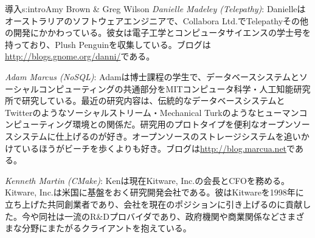 \begin{aosachapter}{導入}{s:intro}{Amy Brown \& Greg Wilson}
\emph{Danielle Madeley (Telepathy)}: Danielleはオーストラリアのソフトウェアエンジニアで、Collabora Ltd.でTelepathyその他の開発にかかわっている。彼女は電子工学とコンピュータサイエンスの学士号を持っており、Plush Penguinを収集している。ブログは\url{http://blogs.gnome.org/danni/}である。

\emph{Adam Marcus (NoSQL)}: Adamは博士課程の学生で、データベースシステムとソーシャルコンピューティングの共通部分をMITコンピュータ科学・人工知能研究所で研究している。最近の研究内容は、伝統的なデータベースシステムとTwitterのようなソーシャルストリーム・Mechanical Turkのようなヒューマンコンピューティング環境との関係だ。研究用のプロトタイプを便利なオープンソースシステムに仕上げるのが好き。オープンソースのストレージシステムを追いかけているほうがビーチを歩くよりも好き。ブログは\url{http://blog.marcua.net}である。

\emph{Kenneth Martin (CMake)}: Kenは現在Kitware, Inc.の会長とCFOを務める。Kitware, Inc.は米国に基盤をおく研究開発会社である。彼はKitwareを1998年に立ち上げた共同創業者であり、会社を現在のポジションに引き上げるのに貢献した。今や同社は一流のR\&Dプロバイダであり、政府機関や商業関係などさまざまな分野にまたがるクライアントを抱えている。


\end{aosachapter}
